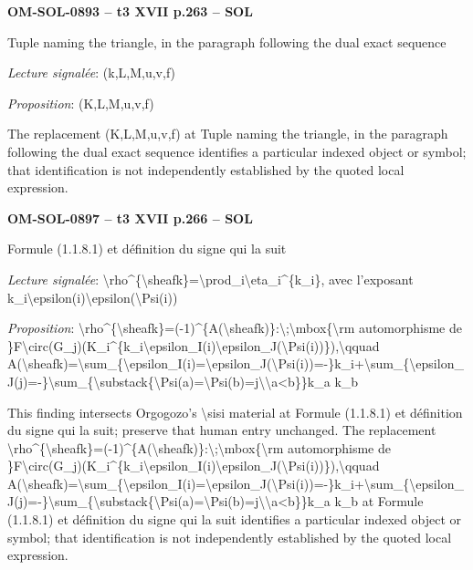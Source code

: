 \par\noindent\textbf{OM-SOL-0893 -- t3 XVII p.263 -- SOL}\par
Tuple naming the triangle, in the paragraph following the dual exact sequence\par
\emph{Lecture signalée}: (k,L,M,u,v,f)\par
\emph{Proposition}: (K,L,M,u,v,f)\par
The replacement (K,L,M,u,v,f) at Tuple naming the triangle, in the paragraph following the dual exact sequence identifies a particular indexed object or symbol; that identification is not independently established by the quoted local expression.\par
\par\noindent\textbf{OM-SOL-0897 -- t3 XVII p.266 -- SOL}\par
Formule (1.1.8.1) et définition du signe qui la suit\par
\emph{Lecture signalée}: \textbackslash{}rho\textasciicircum{}\{\textbackslash{}sheafk\}=\allowbreak \textbackslash{}prod\_i\textbackslash{}eta\_i\textasciicircum{}\{k\_i\}, avec l'exposant k\_i\textbackslash{}epsilon(i)\textbackslash{}epsilon(\textbackslash{}Psi(i))\par
\emph{Proposition}: \textbackslash{}rho\textasciicircum{}\{\textbackslash{}sheafk\}=\allowbreak (-1)\textasciicircum{}\{A(\textbackslash{}sheafk)\}:\textbackslash{};\textbackslash{}mbox\{\textbackslash{}rm automorphisme de \}F\textbackslash{}circ(G\_j)(K\_i\textasciicircum{}\{k\_i\textbackslash{}epsilon\_I(i)\textbackslash{}epsilon\_J(\textbackslash{}Psi(i))\}),\textbackslash{}qquad A(\textbackslash{}sheafk)=\allowbreak \textbackslash{}sum\_\{\textbackslash{}epsilon\_I(i)=\allowbreak \textbackslash{}epsilon\_J(\textbackslash{}Psi(i))=\allowbreak -\}k\_i+\textbackslash{}sum\_\{\textbackslash{}epsilon\_J(j)=\allowbreak -\}\textbackslash{}sum\_\{\textbackslash{}substack\{\textbackslash{}Psi(a)=\allowbreak \textbackslash{}Psi(b)=\allowbreak j\textbackslash{}\textbackslash{}a<b\}\}k\_a k\_b\par
This finding intersects Orgogozo's \textbackslash{}sisi material at Formule (1.1.8.1) et définition du signe qui la suit; preserve that human entry unchanged. The replacement \textbackslash{}rho\textasciicircum{}\{\textbackslash{}sheafk\}=\allowbreak (-1)\textasciicircum{}\{A(\textbackslash{}sheafk)\}:\textbackslash{};\textbackslash{}mbox\{\textbackslash{}rm automorphisme de \}F\textbackslash{}circ(G\_j)(K\_i\textasciicircum{}\{k\_i\textbackslash{}epsilon\_I(i)\textbackslash{}epsilon\_J(\textbackslash{}Psi(i))\}),\textbackslash{}qquad A(\textbackslash{}sheafk)=\allowbreak \textbackslash{}sum\_\{\textbackslash{}epsilon\_I(i)=\allowbreak \textbackslash{}epsilon\_J(\textbackslash{}Psi(i))=\allowbreak -\}k\_i+\textbackslash{}sum\_\{\textbackslash{}epsilon\_J(j)=\allowbreak -\}\textbackslash{}sum\_\{\textbackslash{}substack\{\textbackslash{}Psi(a)=\allowbreak \textbackslash{}Psi(b)=\allowbreak j\textbackslash{}\textbackslash{}a<b\}\}k\_a k\_b at Formule (1.1.8.1) et définition du signe qui la suit identifies a particular indexed object or symbol; that identification is not independently established by the quoted local expression.\par
